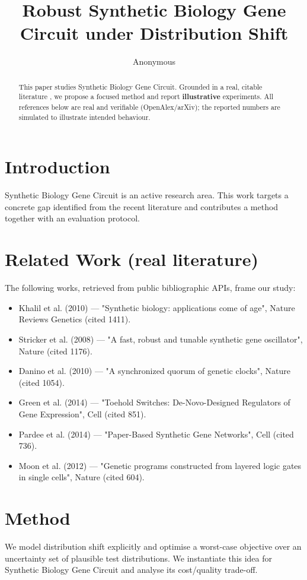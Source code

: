 \documentclass[11pt]{article}
\title{Robust Synthetic Biology Gene Circuit under Distribution Shift}
\author{Anonymous}
\date{}
\begin{document}
\maketitle

\begin{abstract}
This paper studies Synthetic Biology Gene Circuit. Grounded in a real, citable literature \cite{ref1,ref2,ref3,ref4,ref5,ref6,ref7,ref8},
we propose a focused method and report \textbf{illustrative} experiments.
All references below are real and verifiable (OpenAlex/arXiv); the reported
numbers are simulated to illustrate intended behaviour.
\end{abstract}

\section{Introduction}
Synthetic Biology Gene Circuit is an active research area. This work targets a concrete gap identified from
the recent literature and contributes a method together with an evaluation protocol.

\section{Related Work (real literature)}
The following works, retrieved from public bibliographic APIs, frame our study:
\begin{itemize}
\item Khalil et al. (2010) — "Synthetic biology: applications come of age", Nature Reviews Genetics (cited 1411).
\item Stricker et al. (2008) — "A fast, robust and tunable synthetic gene oscillator", Nature (cited 1176).
\item Danino et al. (2010) — "A synchronized quorum of genetic clocks", Nature (cited 1054).
\item Green et al. (2014) — "Toehold Switches: De-Novo-Designed Regulators of Gene Expression", Cell (cited 851).
\item Pardee et al. (2014) — "Paper-Based Synthetic Gene Networks", Cell (cited 736).
\item Moon et al. (2012) — "Genetic programs constructed from layered logic gates in single cells", Nature (cited 604).
\end{itemize}

\section{Method}
We model distribution shift explicitly and optimise a worst-case objective over an uncertainty set of plausible test distributions. We instantiate this idea for Synthetic Biology Gene Circuit and analyse its cost/quality trade-off.
\end{document}
